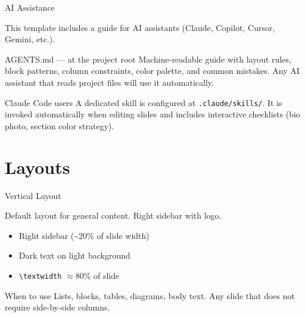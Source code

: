 \documentclass[aspectratio=169,t,xcolor=table]{beamer}
\begin{document}
\begin{frame}{AI Assistance}

    This template includes a guide for AI assistants (Claude, Copilot, Cursor, Gemini, etc.).

    \begin{block}{AGENTS.md — at the project root}
        Machine-readable guide with layout rules, block patterns, column constraints, color palette, and common mistakes. Any AI assistant that reads project files will use it automatically.
    \end{block}

    \vspace{0.5em}
    \begin{recommendationblock}{Claude Code users}
        A dedicated skill is configured at \texttt{.claude/skills/}. It is invoked automatically when editing slides and includes interactive checklists (bio photo, section color strategy).
    \end{recommendationblock}

\end{frame}


\section[DarkPurple]{Layouts}

\begin{frame}{Vertical Layout}

    Default layout for general content. Right sidebar with logo.

    \begin{itemize}
        \item Right sidebar (\textasciitilde 20\% of slide width)
        \item Dark text on light background
        \item \texttt{\textbackslash textwidth} $\approx 80\%$ of slide
    \end{itemize}

    \vspace{0.5em}
    \begin{block}{When to use}
        Lists, blocks, tables, diagrams, body text. Any slide that does not require side-by-side columns.
    \end{block}

\end{frame}
\end{document}

